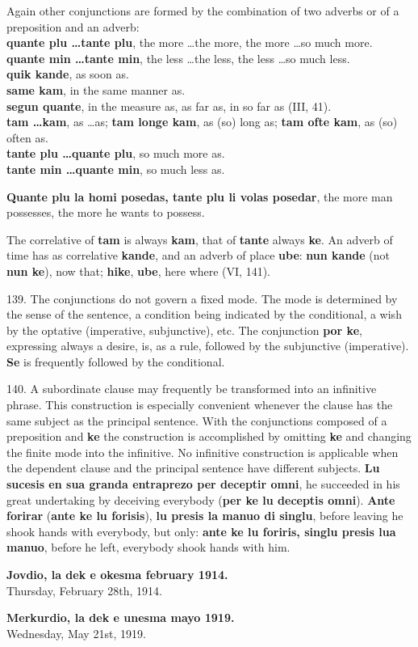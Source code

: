 Again other conjunctions are formed by the combination of two adverbs or of a preposition and an adverb: \\
\textbf{quante plu \ldots tante plu}, the more \ldots the more, the more \ldots so much more. \\
\textbf{quante min \ldots tante min}, the less \ldots the less, the less \ldots so much less. \\
\textbf{quik kande}, as soon as. \\
\textbf{same kam}, in the same manner as. \\
\textbf{segun quante}, in the measure as, as far as, in so far as (III, 41). \\
\textbf{tam \ldots kam}, as \ldots as; \textbf{tam longe kam}, as (so) long as; \textbf{tam ofte kam}, as (so) often as. \\
\textbf{tante plu \ldots quante plu}, so much more as. \\
\textbf{tante min \ldots quante min}, so much less as.

\textbf{Quante plu la homi posedas, tante plu li volas posedar}, the more man possesses, the more he wants to possess.

The correlative of \textbf{tam} is always \textbf{kam}, that of \textbf{tante} always \textbf{ke}. An adverb of time has as correlative \textbf{kande}, and an adverb of place \textbf{ube}: \textbf{nun kande} (not \textbf{nun ke}), now that; \textbf{hike}, \textbf{ube}, here where (VI, 141).

139. The conjunctions do not govern a fixed mode. The mode is determined by the sense of the sentence, a condition being indicated by the conditional, a wish by the optative (imperative, subjunctive), etc. The conjunction \textbf{por ke}, expressing always a desire, is, as a rule, followed by the subjunctive (imperative). \textbf{Se} is frequently followed by the conditional.

140. A subordinate clause may frequently be transformed into an infinitive phrase. This construction is especially convenient whenever the clause has the same subject as the principal sentence. With the conjunctions composed of a preposition and \textbf{ke} the construction is accomplished by omitting \textbf{ke} and changing the finite mode into the infinitive. No infinitive construction is applicable when the dependent clause and the principal sentence have different subjects. \textbf{Lu sucesis en sua granda entraprezo per deceptir omni}, he succeeded in his great undertaking by deceiving everybody (\textbf{per ke lu deceptis omni}). \textbf{Ante forirar }(\textbf{ante ke lu forisis}), \textbf{lu presis la manuo di singlu}, before leaving he shook hands with everybody, but only: \textbf{ante ke lu foriris, singlu presis lua manuo}, before he left, everybody shook hands with him.

\RaggedLeft
\textbf{Jovdio, la dek e okesma february 1914.} \\
Thursday, February 28th, 1914.

\textbf{Merkurdio, la dek e unesma mayo 1919.} \\
Wednesday, May 21st, 1919. \par \justifying